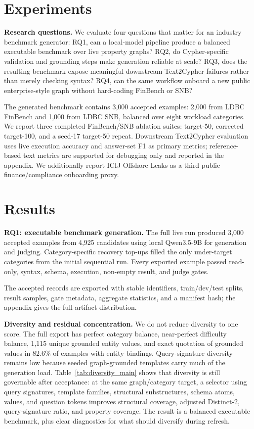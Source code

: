 \documentclass[11pt]{article}
\begin{document}


\section{Experiments}
\noindent\textbf{Research questions.} We evaluate four questions that matter for an industry benchmark generator: RQ1, can a local-model pipeline produce a balanced executable benchmark over live property graphs? RQ2, do Cypher-specific validation and grounding steps make generation reliable at scale? RQ3, does the resulting benchmark expose meaningful downstream Text2Cypher failures rather than merely checking syntax? RQ4, can the same workflow onboard a new public enterprise-style graph without hard-coding FinBench or SNB?

The generated benchmark contains 3,000 accepted examples: 2,000 from LDBC FinBench and 1,000 from LDBC SNB, balanced over eight workload categories. We report three completed FinBench/SNB ablation suites: target-50, corrected target-100, and a seed-17 target-50 repeat. Downstream Text2Cypher evaluation uses live execution accuracy and answer-set F1 as primary metrics; reference-based text metrics are supported for debugging only and reported in the appendix. We additionally report ICIJ Offshore Leaks as a third public finance/compliance onboarding proxy.

\section{Results}
\noindent\textbf{RQ1: executable benchmark generation.} The full live run produced 3,000 accepted examples from 4,925 candidates using local Qwen3.5-9B for generation and judging. Category-specific recovery top-ups filled the only under-target categories from the initial sequential run. Every exported example passed read-only, syntax, schema, execution, non-empty result, and judge gates.



The accepted records are exported with stable identifiers, train/dev/test splits, result samples, gate metadata, aggregate statistics, and a manifest hash; the appendix gives the full artifact distribution.

\noindent\textbf{Diversity and residual concentration.} We do not reduce diversity to one score. The full export has perfect category balance, near-perfect difficulty balance, 1,115 unique grounded entity values, and exact quotation of grounded values in 82.6\% of examples with entity bindings. Query-signature diversity remains low because seeded graph-grounded templates carry much of the generation load. Table~\ref{tab:diversity_main} shows that diversity is still governable after acceptance: at the same graph/category target, a selector using query signatures, template families, structural substructures, schema atoms, values, and question tokens improves structural coverage, adjusted Distinct-2, query-signature ratio, and property coverage. The result is a balanced executable benchmark, plus clear diagnostics for what should diversify during refresh.
\end{document}

